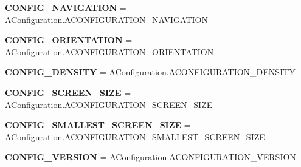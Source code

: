 \begin{DoxyCompactItemize}
\item 
\mbox{\label{classarsc_1_1config_1_1ResTable__config_1_1Config_aecb1f0472c10d9268cf52bdd842980ae}} 
{\bfseries C\+O\+N\+F\+I\+G\+\_\+\+N\+A\+V\+I\+G\+A\+T\+I\+ON} = A\+Configuration.\+A\+C\+O\+N\+F\+I\+G\+U\+R\+A\+T\+I\+O\+N\+\_\+\+N\+A\+V\+I\+G\+A\+T\+I\+ON
\item 
\mbox{\label{classarsc_1_1config_1_1ResTable__config_1_1Config_a6f445f01c36f766367b753751f4ec00d}} 
{\bfseries C\+O\+N\+F\+I\+G\+\_\+\+O\+R\+I\+E\+N\+T\+A\+T\+I\+ON} = A\+Configuration.\+A\+C\+O\+N\+F\+I\+G\+U\+R\+A\+T\+I\+O\+N\+\_\+\+O\+R\+I\+E\+N\+T\+A\+T\+I\+ON
\item 
\mbox{\label{classarsc_1_1config_1_1ResTable__config_1_1Config_aff042ce88ac58d29b9fdd4b925e34b8d}} 
{\bfseries C\+O\+N\+F\+I\+G\+\_\+\+D\+E\+N\+S\+I\+TY} = A\+Configuration.\+A\+C\+O\+N\+F\+I\+G\+U\+R\+A\+T\+I\+O\+N\+\_\+\+D\+E\+N\+S\+I\+TY
\item 
\mbox{\label{classarsc_1_1config_1_1ResTable__config_1_1Config_a19e3c028738a69f5b365ad6514fa2975}} 
{\bfseries C\+O\+N\+F\+I\+G\+\_\+\+S\+C\+R\+E\+E\+N\+\_\+\+S\+I\+ZE} = A\+Configuration.\+A\+C\+O\+N\+F\+I\+G\+U\+R\+A\+T\+I\+O\+N\+\_\+\+S\+C\+R\+E\+E\+N\+\_\+\+S\+I\+ZE
\item 
\mbox{\label{classarsc_1_1config_1_1ResTable__config_1_1Config_a0cb667c5bd2cd0f00dbc72448f58968f}} 
{\bfseries C\+O\+N\+F\+I\+G\+\_\+\+S\+M\+A\+L\+L\+E\+S\+T\+\_\+\+S\+C\+R\+E\+E\+N\+\_\+\+S\+I\+ZE} = A\+Configuration.\+A\+C\+O\+N\+F\+I\+G\+U\+R\+A\+T\+I\+O\+N\+\_\+\+S\+M\+A\+L\+L\+E\+S\+T\+\_\+\+S\+C\+R\+E\+E\+N\+\_\+\+S\+I\+ZE
\item 
\mbox{\label{classarsc_1_1config_1_1ResTable__config_1_1Config_ad5afe77e59294d4362738963c456cbe8}} 
{\bfseries C\+O\+N\+F\+I\+G\+\_\+\+V\+E\+R\+S\+I\+ON} = A\+Configuration.\+A\+C\+O\+N\+F\+I\+G\+U\+R\+A\+T\+I\+O\+N\+\_\+\+V\+E\+R\+S\+I\+ON
\item 
\mbox{\label{classarsc_1_1config_1_1ResTable__config_1_1Config_a4ee41f82ff964ce64bcdb49c23eb715e}} 

\end{DoxyCompactItemize}
